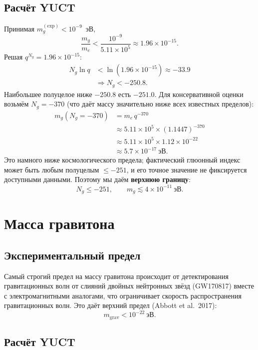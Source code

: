 \documentclass[11pt,a4paper]{article}
\begin{document}
	\subsection{Расчёт YUCT}
	
	Принимая $m_g^{\mathrm{(exp)}} < 10^{-9}$~эВ,
	\[
	\frac{m_g}{m_e} < \frac{10^{-9}}{5.11\times10^5} \approx 1.96\times 10^{-15}.
	\]
	Решая $q^{N_g} = 1.96\times10^{-15}$:
	\[
	\begin{aligned}
		N_g \ln q &< \ln(1.96\times10^{-15}) \approx -33.9 \\
		&\Longrightarrow N_g < -250.8 .
	\end{aligned}
	\]
	Наибольшее полуцелое ниже $-250.8$ есть $-251.0$. Для консервативной оценки возьмём $N_g = -370$
	(что даёт массу значительно ниже всех известных пределов):
	\[
	\begin{aligned}
		m_g(N_g = -370) &= m_e \, q^{-370} \\
		&\approx 5.11\times10^5 \times (1.1447)^{-370} \\
		&\approx 5.11\times10^5 \times 1.12\times10^{-22} \\
		&\approx 5.7 \times 10^{-17}~\mathrm{эВ}.
	\end{aligned}
	\]
	Это намного ниже космологического предела; фактический глюонный индекс может быть любым полуцелым $\le -251$,
	и его точное значение не фиксируется доступными данными. Поэтому мы даём \textbf{верхнюю границу}:
	\[
	\boxed{N_g \le -251}, \qquad
	\boxed{m_g \lesssim 4 \times 10^{-11}~\mathrm{эВ}} .
	\]
	
	\section{Масса гравитона}
	
	\subsection{Экспериментальный предел}
	
	Самый строгий предел на массу гравитона происходит от детектирования гравитационных волн от слияний
	двойных нейтронных звёзд (GW170817) вместе с электромагнитными аналогами, что ограничивает скорость
	распространения гравитационных волн. Это даёт верхний предел (Abbott et al.\ 2017):
	\[
	m_{\mathrm{grav}} < 10^{-22}~\mathrm{эВ}.
	\]
	
	\subsection{Расчёт YUCT}
	
\end{document}
